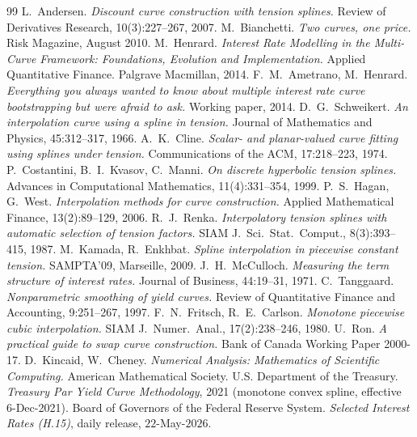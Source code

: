\documentclass[]{interact}
\theoremstyle{plain}
\begin{document}
\begin{thebibliography}{99}
\small
{} L.~Andersen. \emph{Discount curve construction with tension splines.}
Review of Derivatives Research, 10(3):227--267, 2007.
 M.~Bianchetti. \emph{Two curves, one price.} Risk Magazine, August 2010.
 M.~Henrard. \emph{Interest Rate Modelling in the Multi-Curve Framework:
Foundations, Evolution and Implementation.} Applied Quantitative Finance. Palgrave Macmillan, 2014.
 F.~M.~Ametrano, M.~Henrard. \emph{Everything you always wanted to know about
multiple interest rate curve bootstrapping but were afraid to ask.} Working paper, 2014.
 D.~G.~Schweikert. \emph{An interpolation curve using a spline in tension.}
Journal of Mathematics and Physics, 45:312--317, 1966.
 A.~K.~Cline. \emph{Scalar- and planar-valued curve fitting using splines under
tension.} Communications of the ACM, 17:218--223, 1974.
 P.~Costantini, B.~I.~Kvasov, C.~Manni. \emph{On discrete hyperbolic tension
splines.} Advances in Computational Mathematics, 11(4):331--354, 1999.
 P.~S.~Hagan, G.~West. \emph{Interpolation methods for curve construction.}
Applied Mathematical Finance, 13(2):89--129, 2006.
 R.~J.~Renka. \emph{Interpolatory tension splines with automatic selection of
tension factors.} SIAM J.\ Sci.\ Stat.\ Comput., 8(3):393--415, 1987.
 M.~Kamada, R.~Enkhbat. \emph{Spline interpolation in piecewise constant
tension.} SAMPTA'09, Marseille, 2009.
 J.~H.~McCulloch. \emph{Measuring the term structure of interest rates.}
Journal of Business, 44:19--31, 1971.
 C.~Tanggaard. \emph{Nonparametric smoothing of yield curves.}
Review of Quantitative Finance and Accounting, 9:251--267, 1997.
 F.~N.~Fritsch, R.~E.~Carlson. \emph{Monotone piecewise cubic interpolation.}
SIAM J.\ Numer.\ Anal., 17(2):238--246, 1980.
 U.~Ron. \emph{A practical guide to swap curve construction.} Bank of Canada
Working Paper 2000-17.
 D.~Kincaid, W.~Cheney. \emph{Numerical Analysis: Mathematics of Scientific
Computing.} American Mathematical Society.
 U.S. Department of the Treasury. \emph{Treasury Par Yield Curve
Methodology}, 2021 (monotone convex spline, effective 6-Dec-2021).
 Board of Governors of the Federal Reserve System. \emph{Selected Interest Rates
(H.15)}, daily release, $22$-May-$2026$.
\end{thebibliography}
\end{document}

